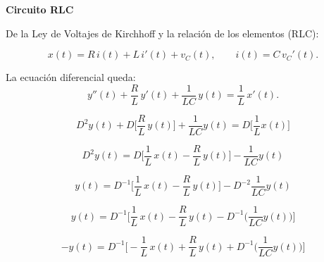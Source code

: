 \textbf{Circuito RLC}

De la Ley de Voltajes de Kirchhoff y la relación de los elementos (RLC):

\[
x(t) = R\,i(t) + L\,i'(t) + v_C(t),
\qquad 
i(t) = C\,v_C'(t).
\]

La ecuación diferencial queda:
\[
y''(t) + \frac{R}{L}\,y'(t) + \frac{1}{LC}\,y(t) = \frac{1}{L}\,x'(t).
\]

$$D^2 y(t) + D\bigg[\dfrac{R}{L} \, y(t)\bigg] + \dfrac{1}{LC} y(t) = D \bigg[\dfrac{1}{L} x(t)\bigg]$$

$$D^2 y(t) = D \bigg[\dfrac{1}{L} \, x(t) - \dfrac{R}{L} \, y(t)\bigg] - \dfrac{1}{LC} y(t) $$

$$y(t) = D^{-1} \bigg[\dfrac{1}{L} \, x(t) - \dfrac{R}{L} \, y(t)\bigg] - D^{-2} \dfrac{1}{LC} y(t)$$

$$y(t) = D^{-1} \bigg[\dfrac{1}{L} \, x(t) - \dfrac{R}{L} \, y(t) - D^{-1} \bigg(\dfrac{1}{LC} y(t) \bigg)  \bigg] $$

$$-y(t) = D^{-1} \bigg[-\dfrac{1}{L} \, x(t) + \dfrac{R}{L} \, y(t) + D^{-1} \bigg(\dfrac{1}{LC} y(t) \bigg)  \bigg]$$

